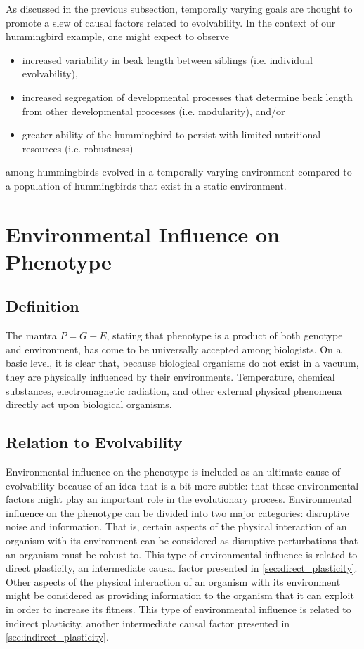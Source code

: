 As discussed in the previous subsection, temporally varying goals are thought to promote a slew of causal factors related to evolvability. In the context of our hummingbird example, one might expect to observe
\begin{itemize}
\item increased variability in beak length between siblings (i.e. individual evolvability),
\item increased segregation of developmental processes that determine beak length from other developmental processes (i.e. modularity), and/or
\item greater ability of the hummingbird to persist with limited nutritional resources (i.e. robustness)
\end{itemize}
among hummingbirds evolved in a temporally varying environment compared to a population of hummingbirds that exist in a static environment.

\section{Environmental Influence on Phenotype}

\subsection{Definition}

The mantra $P = G + E$, stating that phenotype is a product of both genotype and environment, has come to be universally accepted among biologists. On a basic level, it is clear that, because biological organisms do not exist in a vacuum, they are physically influenced by their environments. Temperature, chemical substances, electromagnetic radiation, and other external physical phenomena directly act upon biological organisms.

\subsection{Relation to Evolvability}

Environmental influence on the phenotype is included as an ultimate cause of evolvability because of an idea that is a bit more subtle: that these environmental factors might play an important role in the evolutionary process. Environmental influence on the phenotype can be divided into two major categories: disruptive noise and information. That is, certain aspects of the physical interaction of an organism with its environment can be considered as disruptive perturbations that an organism must be robust to. This type of environmental influence is related to direct plasticity, an intermediate causal factor presented in \ref{sec:direct_plasticity}. Other aspects of the physical interaction of an organism with its environment might be considered as providing information to the organism that it can exploit in order to increase its fitness. This type of environmental influence is related to indirect plasticity, another intermediate causal factor presented in \ref{sec:indirect_plasticity}.

